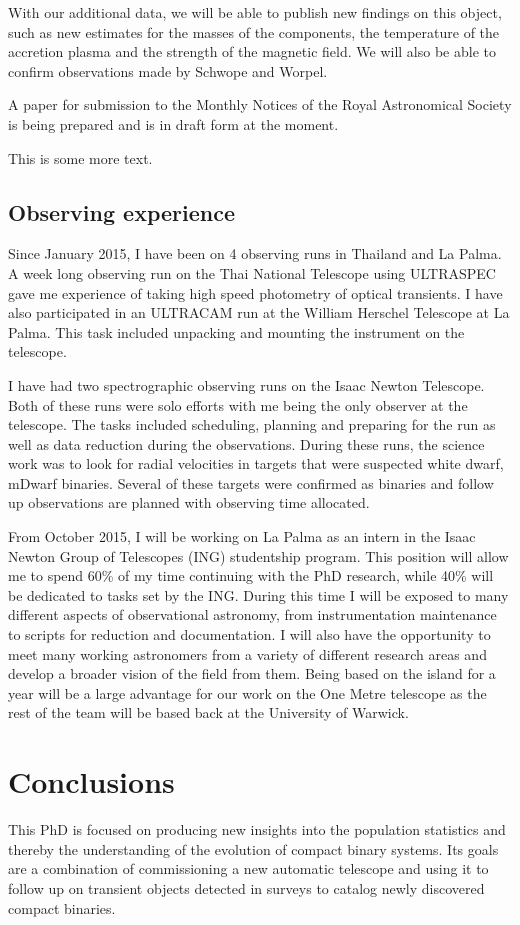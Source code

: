 \documentclass[a4paper,fleqn,usenatbib]{mnras}
\begin{document}
With our additional data, we will be able to publish new findings on this object, such as new estimates for the masses of the components, the temperature of the accretion plasma and the strength of the magnetic field. We will also be able to confirm observations made by Schwope and Worpel. 

A paper for submission to the Monthly Notices of the Royal Astronomical Society is being prepared and is in draft form at the moment. 

This is some more text.

\subsection{Observing experience}
Since January 2015, I have been on 4 observing runs in Thailand and La Palma. A week long observing run on the Thai National Telescope using ULTRASPEC gave me experience of taking high speed photometry of optical transients. I have also participated in an ULTRACAM run at the William Herschel Telescope at La Palma. This task included unpacking and mounting the instrument on the telescope. 

I have had two spectrographic observing runs on the Isaac Newton Telescope. Both of these runs were solo efforts with me being the only observer at the telescope. The tasks included scheduling, planning and preparing for the run as well as data reduction during the observations. During these runs, the science work was to look for radial velocities in targets that were suspected white dwarf, mDwarf binaries. Several of these targets were confirmed as binaries and follow up observations are planned with observing time allocated.  

From October 2015, I will be working on La Palma as an intern in the Isaac Newton Group of Telescopes (ING) studentship program. This position will allow me to spend 60\% of my time continuing with the PhD research, while 40\% will be dedicated to tasks set by the ING. During this time I will be exposed to many different aspects of observational astronomy, from instrumentation maintenance to scripts for reduction and documentation. I will also have the opportunity to meet many working astronomers from a variety of different research areas and develop a broader vision of the field from them.  Being based on the island for a year will be a large advantage for our work on the One Metre telescope as the rest of the team will be based back at the University of Warwick.  

\section{Conclusions}
This PhD is focused on producing new insights into the population statistics and thereby the understanding of the evolution of compact binary systems. Its goals are a combination of commissioning a new automatic telescope and using it to follow up on transient objects detected in surveys to catalog newly discovered compact binaries. 
\end{document}
